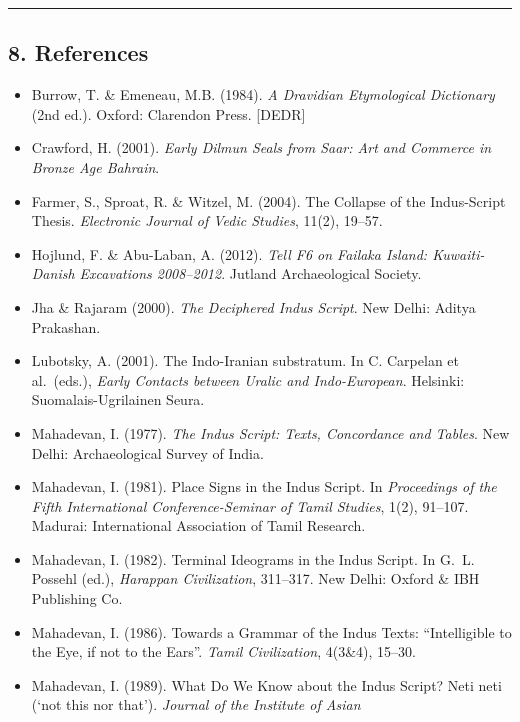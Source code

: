 \documentclass[
]{article}
\providecommand{\tightlist}{%
  \setlength{\itemsep}{0pt}\setlength{\parskip}{0pt}}
\begin{document}
\begin{center}\rule{0.5\linewidth}{0.5pt}\end{center}

\subsection{8. References}\label{references}

\begin{itemize}
\tightlist
\item
  Burrow, T. \& Emeneau, M.B. (1984). \emph{A Dravidian Etymological
  Dictionary} (2nd ed.). Oxford: Clarendon Press. {[}DEDR{]}
\item
  Crawford, H. (2001). \emph{Early Dilmun Seals from Saar: Art and
  Commerce in Bronze Age Bahrain}.
\item
  Farmer, S., Sproat, R. \& Witzel, M. (2004). The Collapse of the
  Indus-Script Thesis. \emph{Electronic Journal of Vedic Studies},
  11(2), 19--57.
\item
  Hojlund, F. \& Abu-Laban, A. (2012). \emph{Tell F6 on Failaka Island:
  Kuwaiti-Danish Excavations 2008--2012}. Jutland Archaeological
  Society.
\item
  Jha \& Rajaram (2000). \emph{The Deciphered Indus Script}. New
  Delhi: Aditya Prakashan.
\item
  Lubotsky, A. (2001). The Indo-Iranian substratum. In C. Carpelan et
  al.~(eds.), \emph{Early Contacts between Uralic and Indo-European}.
  Helsinki: Suomalais-Ugrilainen Seura.
\item
  Mahadevan, I. (1977). \emph{The Indus Script: Texts, Concordance and
  Tables}. New Delhi: Archaeological Survey of India.
\item
  Mahadevan, I. (1981). Place Signs in the Indus Script. In
  \emph{Proceedings of the Fifth International Conference-Seminar of
  Tamil Studies}, 1(2), 91--107. Madurai: International Association
  of Tamil Research.
\item
  Mahadevan, I. (1982). Terminal Ideograms in the Indus Script. In
  G.~L. Possehl (ed.), \emph{Harappan Civilization}, 311--317. New
  Delhi: Oxford \& IBH Publishing Co.
\item
  Mahadevan, I. (1986). Towards a Grammar of the Indus Texts:
  ``Intelligible to the Eye, if not to the Ears''. \emph{Tamil
  Civilization}, 4(3\&4), 15--30.
\item
  Mahadevan, I. (1989). What Do We Know about the Indus Script? Neti
  neti (`not this nor that'). \emph{Journal of the Institute of Asian
}
\end{itemize}
\end{document}
